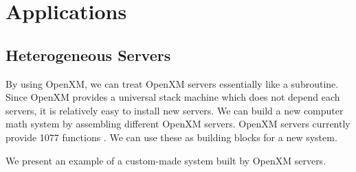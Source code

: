 \section{Applications}

\subsection{Heterogeneous Servers}

\def\pd#1{ \partial_{#1} }

By using OpenXM, we can treat OpenXM servers essentially 
like a subroutine.
Since OpenXM provides a universal stack machine which does not
depend each servers, 
it is relatively easy to install new servers.
We can build a new computer math system by assembling
different OpenXM servers.
OpenXM servers currently provide 1077 functions
\cite{openxm-1077}.
We can use these as building blocks for a new system.

We present an example of a custom-made system
built by OpenXM servers.

%

